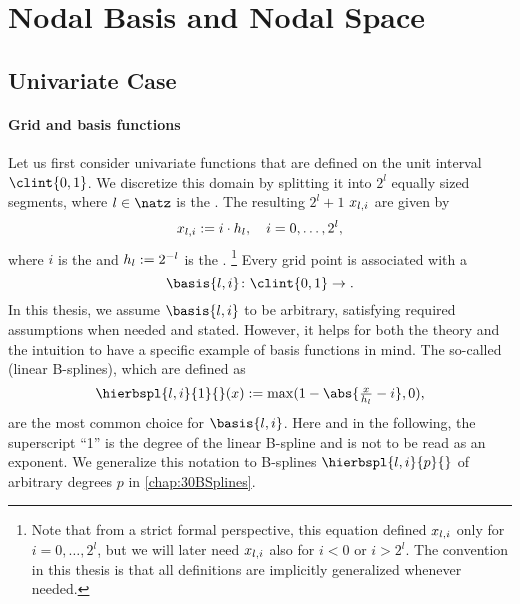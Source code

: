 \section{Nodal Basis and Nodal Space}
\label{sec:21nodalSpaces}



\subsection{Univariate Case}
\label{sec:211nodalUV}

\paragraph{Grid and basis functions}

Let us first consider univariate functions
that are defined on the unit interval $\clint{0, 1}$.
We discretize this domain by splitting it into $2^l$ equally sized segments,
where $l \in \natz$ is the .
The resulting $2^l + 1$  $x_{l,i}$ are given by
\begin{equation}
  x_{l,i} := i \cdot h_{l},\quad
  i = 0, \dotsc, 2^l,
\end{equation}
where $i$ is the  and $h_{l} := 2^{-l}$ is the .%
\footnote{%
  Note that from a strict formal perspective,
  this equation defined $x_{l,i}$ only for $i = 0, \dotsc, 2^l$,
  but we will later need $x_{l,i}$ also for $i < 0$ or $i > 2^l$.
  The convention in this thesis is that all definitions are
  implicitly generalized whenever needed.%
}
Every grid point is associated with a 
\begin{equation}
  \basis{l,i}\colon \clint{0, 1} \to \real.
\end{equation}
In this thesis, we assume $\basis{l,i}$ to be arbitrary,
satisfying required assumptions when needed and stated.
However, it helps for both the theory and the intuition to have a
specific example of basis functions in mind.
The so-called  (linear B-splines), which are defined as
\begin{equation}
  \label{eq:hatFunctionUV}
  \hierbspl{l,i}{1}{}(x)
  := \max(1 - \abs{\tfrac{x}{\ms{l}} - i}, 0),
\end{equation}
are the most common choice for $\basis{l,i}$.
Here and in the following,
the superscript ``1'' is the degree of the linear B-spline and
is not to be read as an exponent.
We generalize this notation to B-splines $\hierbspl{l,i}{p}{}$ of
arbitrary degrees $p$ in \cref{chap:30BSplines}.

